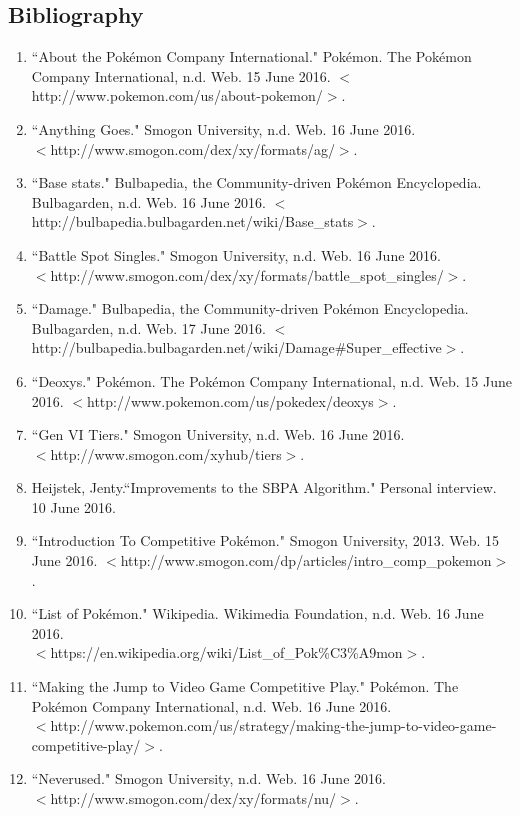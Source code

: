 \documentclass{article}
\begin{document}
\subsection{Bibliography}
\begin{enumerate}
	\item ``About the Pokémon Company International." Pok\'emon. The Pok\'emon Company International, n.d. Web. 15 June 2016. $<$http://www.pokemon.com/us/about-pokemon/$>$.
	\item ``Anything Goes." Smogon University, n.d. Web. 16 June 2016. \\$<$http://www.smogon.com/dex/xy/formats/ag/$>$. 
	\item ``Base stats." Bulbapedia, the Community-driven Pokémon Encyclopedia. Bulbagarden, n.d. Web. 16 June 2016. $<$http://bulbapedia.bulbagarden.net/wiki/Base\_stats$>$.
	\item ``Battle Spot Singles." Smogon University, n.d. Web. 16 June 2016. \\$<$http://www.smogon.com/dex/xy/formats/battle\_spot\_singles/$>$.
	\item ``Damage." Bulbapedia, the Community-driven Pokémon Encyclopedia. Bulbagarden, n.d. Web. 17 June 2016. $<$http://bulbapedia.bulbagarden.net/wiki/Damage\#Super\_effective$>$.
	\item ``Deoxys." Pok\'emon. The Pok\'emon Company International, n.d. Web. 15 June 2016. $<$http://www.pokemon.com/us/pokedex/deoxys$>$. 
	\item ``Gen VI Tiers." Smogon University, n.d. Web. 16 June 2016. \\$<$http://www.smogon.com/xyhub/tiers$>$. 
	\item Heijstek, Jenty.``Improvements to the SBPA Algorithm." Personal interview. 10 June 2016.
	\item``Introduction To Competitive Pok\'emon." Smogon University, 2013. Web. 15 June 2016. $<$http://www.smogon.com/dp/articles/intro\_comp\_pokemon$>$.
	\item ``List of Pokémon." Wikipedia. Wikimedia Foundation, n.d. Web. 16 June 2016. \\$<$https://en.wikipedia.org/wiki/List\_of\_Pok\%C3\%A9mon$>$.
	\item ``Making the Jump to Video Game Competitive Play." Pok\'emon. The Pok\'emon Company International, n.d. Web. 16 June 2016. \\$<$http://www.pokemon.com/us/strategy/making-the-jump-to-video-game-competitive-play/$>$.
	\item ``Neverused." Smogon University, n.d. Web. 16 June 2016. \\$<$http://www.smogon.com/dex/xy/formats/nu/$>$.

\end{enumerate}
\end{document}
